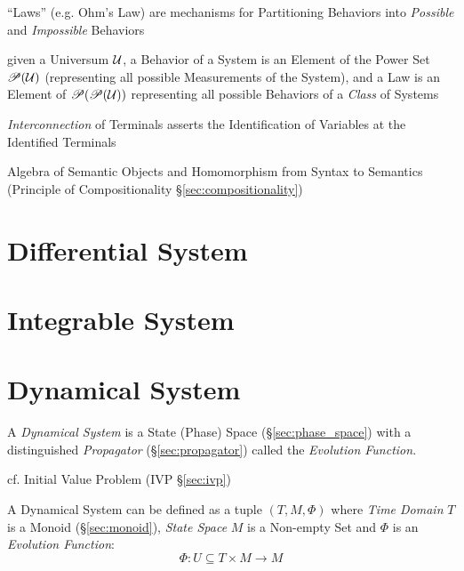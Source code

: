 
``Laws'' (e.g. Ohm's Law) are mechanisms for Partitioning Behaviors
into \emph{Possible} and \emph{Impossible} Behaviors

given a Universum $\mathcal{U}$, a Behavior of a System is an Element
of the Power Set $\mathscr{P}(\mathcal{U})$ (representing all possible
Measurements of the System), and a Law is an Element of
$\mathscr{P}(\mathscr{P}(\mathcal{U}))$ representing all possible Behaviors of a
\emph{Class} of Systems

\emph{Interconnection} of Terminals asserts the Identification of
Variables at the Identified Terminals

Algebra of Semantic Objects and Homomorphism from Syntax to Semantics
(Principle of Compositionality \S\ref{sec:compositionality})



\section{Differential System}\label{sec:differential_system}




\section{Integrable System}\label{sec:integrable_system}



\section{Dynamical System}\label{sec:dynamical_system}

A \emph{Dynamical System} is a State (Phase) Space (\S\ref{sec:phase_space})
with a distinguished \emph{Propagator} (\S\ref{sec:propagator}) called the
\emph{Evolution Function}.

\fist cf. Initial Value Problem (IVP \S\ref{sec:ivp})

A Dynamical System can be defined as a tuple $(T,M,\Phi)$ where \emph{Time
  Domain} $T$ is a Monoid (\S\ref{sec:monoid}), \emph{State Space} $M$ is a
Non-empty Set and $\Phi$ is an \emph{Evolution Function}:
\[
  \Phi : U \subseteq T \times M \rightarrow M
\]

